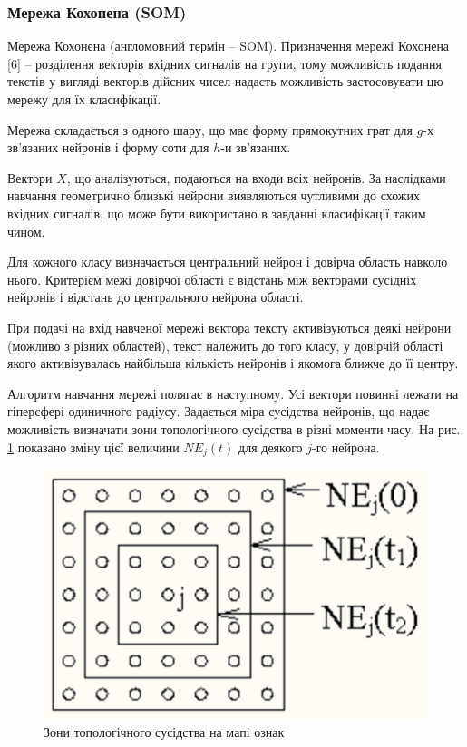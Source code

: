 \subsubsection{Мережа Кохонена (SOM)}
Мережа Кохонена (англомовний термін – SOM). Призначення мережі Кохонена [6] – розділення векторів вхідних сигналів на групи, тому можливість подання текстів у вигляді векторів дійсних чисел надасть можливість застосовувати цю мережу для їх класифікації. 

Мережа складається з одного шару, що має форму прямокутних грат для $g$-х зв'язаних нейронів і форму соти для $h$-и зв'язаних. 

Вектори $X$, що аналізуються, подаються на входи всіх нейронів. За наслідками навчання геометрично близькі нейрони виявляються чутливими до схожих вхідних сигналів, що може бути використано в завданні класифікації таким чином.

Для кожного класу визначається центральний нейрон і довірча область навколо нього. Критерієм межі довірчої області є відстань між векторами сусідніх нейронів і відстань до центрального нейрона області. 

При подачі на вхід навченої мережі вектора тексту активізуються деякі нейрони (можливо з різних областей), текст належить до того класу, у довірчій області якого активізувалась найбільша кількість нейронів і якомога ближче до її центру. 

Алгоритм навчання мережі полягає в наступному. Усі вектори повинні лежати на гіперсфері одиничного радіусу. Задається міра сусідства нейронів, що надає можливість визначати зони топологічного сусідства в різні моменти часу. На рис. \ref{fig:learn_neura} показано зміну цієї величини $NE_{j}(t)$ для деякого $j$-го нейрона. 

\begin{figure}[h!]
  \includegraphics[width=\linewidth]{figures/learn_neura.png}
  \caption{Зони топологічного сусідства на мапі ознак}
  \label{fig:learn_neura}
\end{figure}

